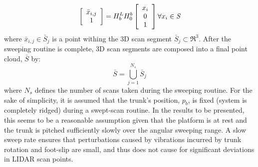 				\begin{equation}
					\left[
						\begin{array}{c}
							\bar{x}_{i,j} \\ 1
						\end{array}
					\right]
				 = H^{L}_{b} H^{b}_{0}	
					\left[
						\begin{array}{c}
							x_{i} \\ 0 \\ 1
						\end{array}
					\right] \forall x_{i} \in \emph{S}
					\label{eq::scan_to_segment}
				\end{equation}
			where $\bar{x}_{i,j} \in \bar{S}_{j}$ is a point withing the 3D \Jth scan segment $\bar{S}_{j} \subset \Re^{3}$. After the sweeping routine is complete, 3D scan segments are composed into a final point cloud, $\bar{S}$ by:
			\begin{equation}
				\bar{S} = \bigcup_{j=1}^{N_{s}} \bar{S}_{j}
			\end{equation}
			where $N_{s}$ defines the number of scans taken during the sweeping routine. For the sake of simplicity, it is assumed that the trunk's position, $p_{b}$, is fixed (system is completely ridged) during a swept-scan routine. In the results to be presented, this seems to be a reasonable assumption given that the platform is at rest and the trunk is pitched sufficiently slowly over the angular sweeping range. A slow sweep rate ensures that perturbations caused by vibrations incurred by trunk rotation and foot-slip are small, and thus does not cause for significant deviations in LIDAR scan points.
